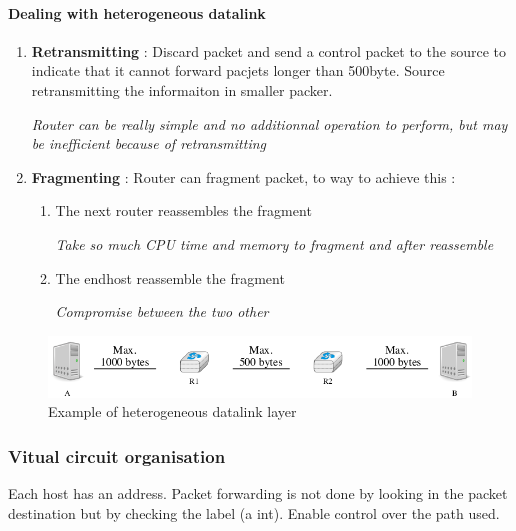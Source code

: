 \paragraph{Dealing with heterogeneous datalink}

\begin{enumerate}
    \item \textbf{Retransmitting} : Discard packet and send a control packet to the source to indicate that it cannot forward pacjets longer than 500byte. Source retransmitting the informaiton in smaller packer.
        \begin{center}
            \textit{Router can be really simple and no additionnal operation to perform,
            but may be inefficient because of retransmitting}
        \end{center}
    \item \textbf{Fragmenting} : Router can fragment packet, to way to achieve this :
        \begin{enumerate}
            \item The next router reassembles the fragment
                \begin{center}
                    \textit{Take so much CPU time and memory to fragment 
                    and after reassemble}
                \end{center}
            \item The endhost reassemble the fragment
                \begin{center}
                    \textit{Compromise between the two other}
                \end{center}
        \end{enumerate}
\end{enumerate}

\begin{figure}[h]
    \centering
    \includegraphics[width=12cm]{heterogeneous.png}
    \caption{Example of heterogeneous datalink layer}
\end{figure}

\subsubsection{Vitual circuit organisation}
Each host has an address. Packet forwarding is not done by looking in the packet destination but by checking 
the label (a int). Enable control over the path used.

